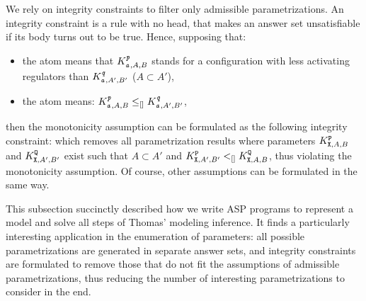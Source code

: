 We rely on integrity constraints to filter only admissible parametrizations.
An integrity constraint is a rule with no head, that makes an answer set unsatisfiable if its body turns out to be true.
Hence, supposing that:
\begin{itemize}
  \item the  atom means that $K^{\texttt{\textit{p}}}_{\texttt{\textit{a}},A,B}$ stands for a configuration with less activating regulators than $K^{\texttt{\textit{q}}}_{\texttt{\textit{a}},A',B'}$ (\ie $A \subset A'$),
  \item the  atom means: $K^{\texttt{\textit{p}}}_{\texttt{\textit{a}},A,B} \leq_{[]} K^{\texttt{\textit{q}}}_{\texttt{\textit{a}},A',B'}$,
\end{itemize}
then the monotonicity assumption can be formulated as the following integrity constraint:
which removes all parametrization results where parameters $K^{\texttt{P}}_{\texttt{X},A,B}$ and $K^{\texttt{Q}}_{\texttt{X},A',B'}$ exist such that $A \subset A'$ and $K^{\texttt{P}}_{\texttt{X},A',B'} <_{[]} K^{\texttt{Q}}_{\texttt{X},A,B}$, thus violating the monotonicity assumption.
Of course, other assumptions can be formulated in the same way.

This subsection succinctly described how we write ASP programs to represent a model and solve all steps of Thomas' modeling inference.
It finds a particularly interesting application in the enumeration of parameters: all possible parametrizations are generated in separate answer sets, and integrity constraints are formulated to remove those that do not fit the assumptions of admissible parametrizations,
thus reducing the number of interesting parametrizations to consider in the end.
